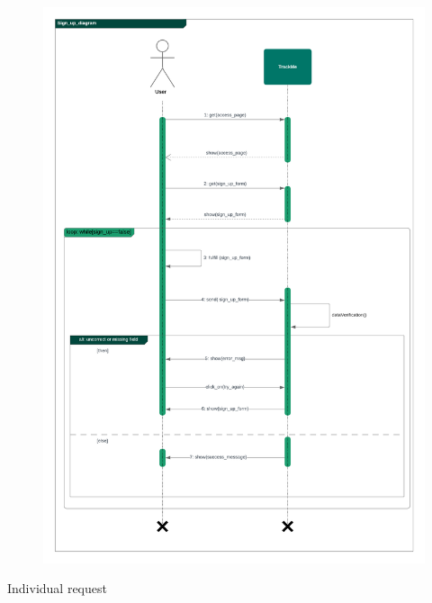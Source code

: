 \documentclass{article}
\begin{document}
\begin{legal}
\begin{legal}
\begin{legal}
\begin{legal}
\begin{figure}[H]
  				\includegraphics[width=\linewidth]{./images/seq-diagrams/Sign_up_diagram.png}
				\end{figure}
			\item Individual request
				\begin{figure}[H]

\end{figure}
\end{legal}
\end{legal}
\end{legal}
\end{legal}
\end{document}

